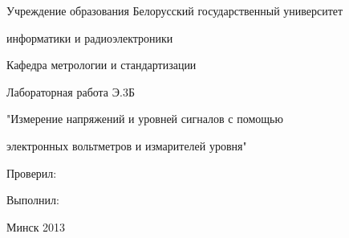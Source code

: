 \thispagestyle{empty}

\begin{center}
Учреждение образования
Белорусский государственный университет\par
информатики и радиоэлектроники\par 
\vspace{5mm}
Кафедра метрологии и стандартизации\par
\par

\end{center}

\vspace{70mm}

\begin{center}
Лабораторная работа Э.3Б\par
"Измерение напряжений и уровней сигналов с помощью\par
электронных вольтметров и измарителей уровня"\par
\end{center}

\vspace{50mm}

\begin{multicols}{2}
Проверил:

\begin{flushright}

Выполнил:

\end{flushright}
\end{multicols}

\vspace{50mm}
\begin{center}
{Минск 2013}
\end{center}

\newpage
